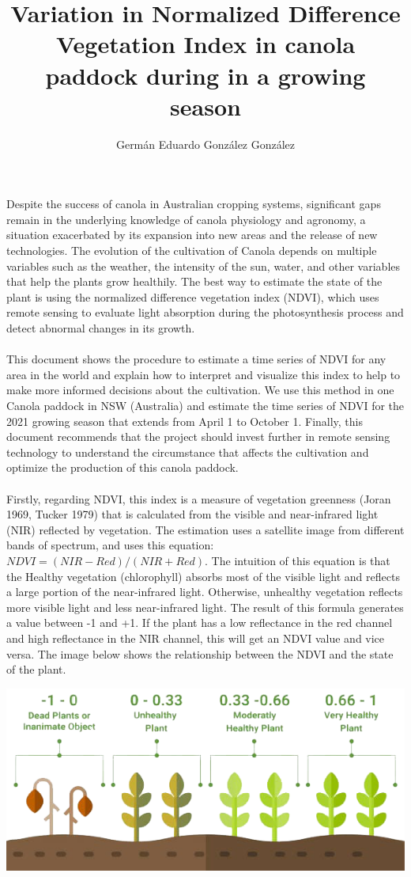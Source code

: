 \documentclass[fleqn,10pt]{wlscirep}
\title{Variation in Normalized Difference Vegetation Index in canola paddock during in a growing season}
\author[1,*]{Germán Eduardo González González}
\begin{document}
\flushbottom
\maketitle 
Despite the success of canola in Australian cropping systems, significant gaps remain in the underlying knowledge of canola physiology and agronomy, a situation exacerbated by its expansion into new areas and the release of new technologies. The evolution of the cultivation of Canola depends on multiple variables such as the weather, the intensity of the sun, water, and other variables that help the plants grow healthily. The best way to estimate the state of the plant is using the normalized difference vegetation index (NDVI), which uses remote sensing to evaluate light absorption during the photosynthesis process and detect abnormal changes in its growth.
\\~\\
This document shows the procedure to estimate a time series of NDVI for any area in the world and explain how to interpret and visualize this index to help to make more informed decisions about the cultivation. We use this method in one Canola paddock in NSW (Australia) and estimate the time series of NDVI for the 2021 growing season that extends from April 1 to October 1. Finally, this document recommends that the project should invest further in remote sensing technology to understand the circumstance that affects the cultivation and optimize the production of this canola paddock.
\\~\\
Firstly, regarding NDVI, this index is a measure of vegetation greenness (Joran 1969, Tucker 1979) that is calculated from the visible and near-infrared light (NIR) reflected by vegetation. The estimation uses a satellite image from different bands of spectrum, and uses this equation: $ NDVI =(NIR-Red)/(NIR+Red) $. The intuition of this equation is that the Healthy vegetation (chlorophyll) absorbs most of the visible light and reflects a large portion of the near-infrared light. Otherwise, unhealthy vegetation reflects more visible light and less near-infrared light. The result of this formula generates a value between -1 and +1. If the plant has a low reflectance in the red channel and high reflectance in the NIR channel, this will get an NDVI value and vice versa. The image below shows the relationship between the NDVI and the state of the plant.
\begin{center}
\captionsetup{type=figure}
\includegraphics[width=0.38\linewidth]{scale.png}
\label{fig:esquema_general}
\end{center}
\end{document}
